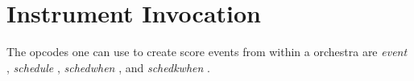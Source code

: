 \begin{comment}
\documentclass[10pt]{article}
\usepackage{fullpage, graphicx, url}
\setlength{\parskip}{1ex}
\setlength{\parindent}{0ex}
\title{Instrument Invocation}



\begin{tabular}{ccc}
The Alternative Csound Reference Manual & & \\
Previous &Instrument Control &Next

\end{tabular}

\end{comment}
\section{Instrument Invocation}


  The opcodes one can use to create score events from within a orchestra are \emph{event}
, \emph{schedule}
, \emph{schedwhen}
, and \emph{schedkwhen}
. 


\begin{comment}
\begin{tabular}{lcr}
Previous &Home &Next \\
Introduction to FLTK Widgets and GUI controllers &Up &Macros

\end{tabular}



\end{comment}
